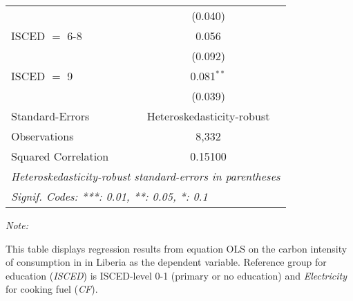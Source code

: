 \begin{table}[htbp!]
\begin{adjustbox}{width = 1\textwidth, max height = 0.95\textheight, center}
\begin{threeparttable}[b]
\begin{tabular}{lc}
                                & (0.040)\\   
            ISCED $=$ 6-8       & 0.056\\   
                                & (0.092)\\   
            ISCED $=$ 9         & 0.081$^{**}$\\   
                                & (0.039)\\   
            \midrule 
            Standard-Errors     & Heteroskedasticity-robust \\   
            Observations        & 8,332\\  
            Squared Correlation & 0.15100\\  
            \midrule \midrule
            \multicolumn{2}{l}{\emph{Heteroskedasticity-robust standard-errors in parentheses}}\\
            \multicolumn{2}{l}{\emph{Signif. Codes: ***: 0.01, **: 0.05, *: 0.1}}\\
         \end{tabular}
         
         \begin{tablenotes}\item \medskip \textit{Note:}
            \item This table displays regression results from equation OLS on the carbon intensity of consumption in  in Liberia as the dependent variable. Reference group for education (\textit{ISCED}) is ISCED-level 0-1 (primary or no education) and \textit{Electricity} for cooking fuel (\textit{CF}).
         \end{tablenotes}
      \end{threeparttable}
   \end{adjustbox}
\end{table}


